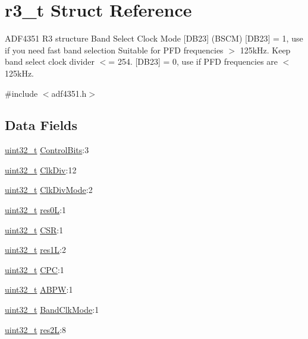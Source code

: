 \hypertarget{structr3__t}{}\section{r3\+\_\+t Struct Reference}
\label{structr3__t}


A\+D\+F4351 R3 structure Band Select Clock Mode \mbox{[}D\+B23\mbox{]} (B\+S\+CM) \mbox{[}D\+B23\mbox{]} = 1, use if you need fast band selection Suitable for P\+FD frequencies $>$ 125k\+Hz. Keep band select clock divider $<$= 254. \mbox{[}D\+B23\mbox{]} = 0, use if P\+FD frequencies are $<$ 125k\+Hz.  




{\ttfamily \#include $<$adf4351.\+h$>$}

\subsection*{Data Fields}
\begin{DoxyCompactItemize}
\item 
\hyperlink{send_8c_a435d1572bf3f880d55459d9805097f62}{uint32\+\_\+t} \hyperlink{structr3__t_a4d5d480a6e629c07e0bb5575fb0023bb}{Control\+Bits}\+:3
\item 
\hyperlink{send_8c_a435d1572bf3f880d55459d9805097f62}{uint32\+\_\+t} \hyperlink{structr3__t_ad53a3132e2a6601f80cb4e455a4dea49}{Clk\+Div}\+:12
\item 
\hyperlink{send_8c_a435d1572bf3f880d55459d9805097f62}{uint32\+\_\+t} \hyperlink{structr3__t_a29d101adb2cb66623bba16d9783cf752}{Clk\+Div\+Mode}\+:2
\item 
\hyperlink{send_8c_a435d1572bf3f880d55459d9805097f62}{uint32\+\_\+t} \hyperlink{structr3__t_aa10065b1b2c2aed70a9e4427e76db29a}{res0L}\+:1
\item 
\hyperlink{send_8c_a435d1572bf3f880d55459d9805097f62}{uint32\+\_\+t} \hyperlink{structr3__t_a295a90a5720da8b88db8bf1420c806e2}{C\+SR}\+:1
\item 
\hyperlink{send_8c_a435d1572bf3f880d55459d9805097f62}{uint32\+\_\+t} \hyperlink{structr3__t_ab655f5b258ae1446791fbe557680daa6}{res1L}\+:2
\item 
\hyperlink{send_8c_a435d1572bf3f880d55459d9805097f62}{uint32\+\_\+t} \hyperlink{structr3__t_a61a4e7b02af2c11e18e823eac349fabf}{C\+PC}\+:1
\item 
\hyperlink{send_8c_a435d1572bf3f880d55459d9805097f62}{uint32\+\_\+t} \hyperlink{structr3__t_a5f81f8e2e2dedd4c4b7d939e51ae2c4c}{A\+B\+PW}\+:1
\item 
\hyperlink{send_8c_a435d1572bf3f880d55459d9805097f62}{uint32\+\_\+t} \hyperlink{structr3__t_a47117d4da83d72bd3e84a4f1f9804120}{Band\+Clk\+Mode}\+:1
\item 
\hyperlink{send_8c_a435d1572bf3f880d55459d9805097f62}{uint32\+\_\+t} \hyperlink{structr3__t_a2a1f40b19f451868336ca6558f653f1d}{res2L}\+:8
\end{DoxyCompactItemize}


